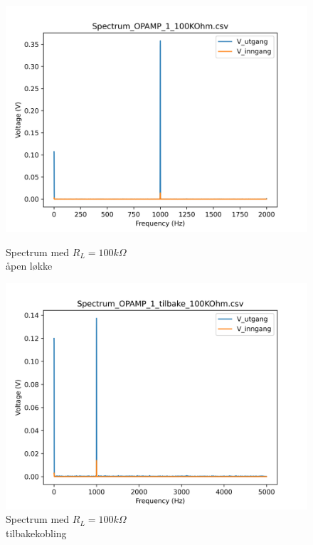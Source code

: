 \begin{figure}[!h]
    \begin{minipage}[c]{0.5\textwidth}
        \centering
        \includegraphics[width=1\textwidth]{Bilder/Spectrum_OPAMP_1_100KOhm.png}
        \caption{Spectrum med $R_L = 100k\Omega$\\ åpen løkke}
        \label{fig:Spectrum_OPAMP_1_100KOhm}
    \end{minipage}
    \hfill
    \begin{minipage}[c]{0.5\textwidth}
        \centering
        \includegraphics[width=1\textwidth]{Bilder/Spectrum_OPAMP_1_tilbake_100KOhm.png}
        \caption{Spectrum med $R_L = 100k\Omega$\\ tilbakekobling}
        \label{fig:Spectrum_OPAMP_1_tilbake_100KOhm}
    \end{minipage}
\end{figure}

